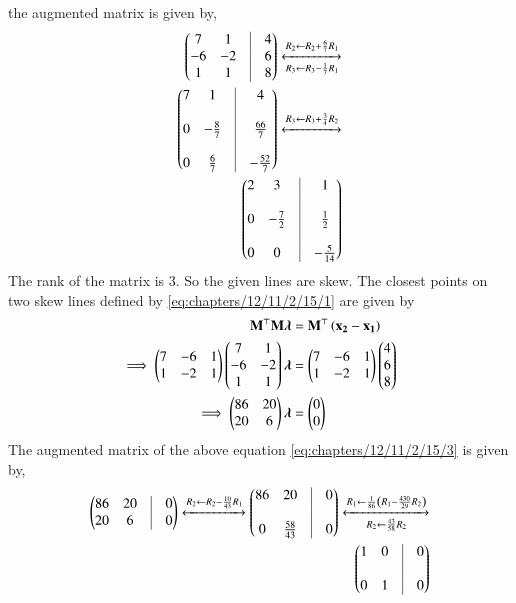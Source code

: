\documentclass[journal,12pt,twocolumn]{IEEEtran}
\begin{document}
the augmented matrix is given by,
\begin{align}
\myvec{7&1&\vrule&4\\-6&-2&\vrule&6\\1&1&\vrule&8}
\xleftrightarrow[R_3 \leftarrow R_3 - \frac{1}{7}R_1]{R_2 \leftarrow R_2 + \frac{6}{7}R_1}\\
\myvec{7&1&\vrule&4\\&&\vrule\\0&-\frac{8}{7}&\vrule&\frac{66}{7}\\&&\vrule\\0&\frac{6}{7}&\vrule&-\frac{52}{7}}
\xleftrightarrow{R_3 \leftarrow R_3 + \frac{3}{4}R_2}\\
\myvec{2&3&\vrule&1\\&&\vrule\\0&-\frac{7}{2}&\vrule&\frac{1}{2}\\&&\vrule\\0&0&\vrule&-\frac{5}{14}}
\end{align}
The rank of the matrix is 3. So the given lines are skew.
The closest points on two skew lines defined by \eqref{eq:chapters/12/11/2/15/1} are given by 
\begin{align}
\mathbf{M}^\top \mathbf{M}\bm{\lambda} &= \mathbf{M}^\top\left(\mathbf{x_2}-\mathbf{x_1}\right)\\
\implies \begin{pmatrix}7&-6&1\\1&-2&1\end{pmatrix} \begin{pmatrix}7&1\\-6&-2\\1&1\end{pmatrix}\bm{\lambda} &= \begin{pmatrix}7&-6&1\\1&-2&1\end{pmatrix} \begin{pmatrix}4\\6\\8\end{pmatrix}\\
\implies \begin{pmatrix}86&20\\20&6\end{pmatrix}\bm{\lambda} &= \begin{pmatrix}0\\0\end{pmatrix}
\label{eq:chapters/12/11/2/15/3}
\end{align}
The augmented matrix of the above equation \eqref{eq:chapters/12/11/2/15/3} is given by,
\begin{align}
\myvec{86&20&\vrule&0\\20&6&\vrule&0}
\xleftrightarrow{R_2 \leftarrow R_2 - \frac{10}{43}R_1}
\myvec{86&20&\vrule&0 \\&&\vrule\\ 0&\frac{58}{43}&\vrule&0}
\xleftrightarrow[R_2 \leftarrow \frac{43}{58}R_2]{R_1 \leftarrow \frac{1}{86} \brak{R_1 - \frac{430}{29}R_2}}\\
\myvec{1&0&\vrule&0 \\&&\vrule\\ 0&1&\vrule&0}
\end{align}
\end{document}

